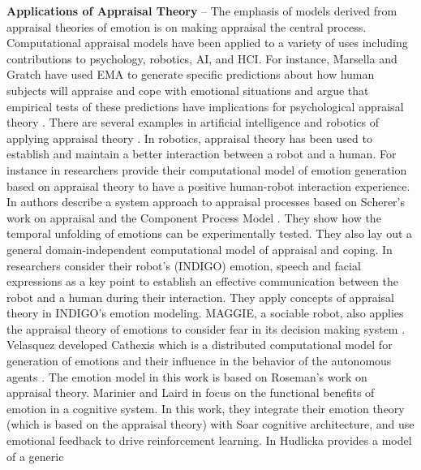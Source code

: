 \textbf{Applications of Appraisal Theory} -- The emphasis of models derived from
appraisal theories of emotion is on making appraisal the central process.
Computational appraisal models have been applied to a variety of uses including
contributions to psychology, robotics, AI, and HCI. For instance, Marsella and
Gratch have used EMA \cite{marsella:ema-process-model} to generate specific
predictions about how human subjects will appraise and cope with emotional
situations and argue that empirical tests of these predictions have implications
for psychological appraisal theory \cite{gratch:assessing-appraisal}
\cite{marsella:assessing-coping}. There are several examples in artificial
intelligence and robotics of applying appraisal theory
\cite{adam:bdi-emotional-companion} \cite{kim:model-hri-appraisal}
\cite{marsella:ema-process-model}. In robotics, appraisal theory has been used
to establish and maintain a better interaction between a robot and a human. For
instance in \cite{kim:model-hri-appraisal} researchers provide their
computational model of emotion generation based on appraisal theory to have a
positive human-robot interaction experience. In
\cite{sander:systems-approach-appraisal} authors describe a system approach to
appraisal processes based on Scherer's work on appraisal and the Component
Process Model \cite{scherer:nature-function-emotion}. They show how the temporal
unfolding of emotions can be experimentally tested. They also lay out a general
domain-independent computational model of appraisal and coping. In
\cite{vogiatzis:robot-museum} researchers consider their robot's (INDIGO)
emotion, speech and facial expressions as a key point to establish an effective
communication between the robot and a human during their interaction. They apply
concepts of appraisal theory in INDIGO's emotion modeling. MAGGIE, a sociable
robot, also applies the appraisal theory of emotions to consider fear in its
decision making system \cite{castro:autonomous-robot-fear}. Velasquez developed
Cathexis which is a distributed computational model for generation of emotions
and their influence in the behavior of the autonomous agents
\cite{velasquez:emotions-motivations-agents}. The emotion model in this work is
based on Roseman's work on appraisal theory. Marinier and Laird in
\cite{marinier:emotion-reinforcement} focus on the functional benefits of
emotion in a cognitive system. In this work, they integrate their emotion theory
(which is based on the appraisal theory) with Soar cognitive architecture, and
use emotional feedback to drive reinforcement learning. In
\cite{hudlicka:emotinos-reasons} Hudlicka provides a model of a generic
